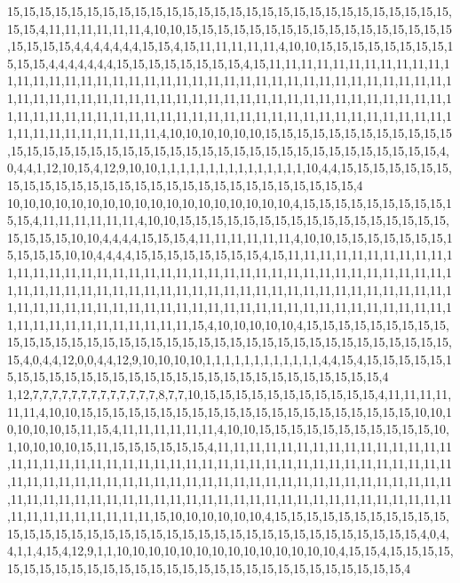 15,15,15,15,15,15,15,15,15,15,15,15,15,15,15,15,15,15,15,15,15,15,15,15,15,15,15,15,15,15,4,11,11,11,11,11,11,4,10,10,15,15,15,15,15,15,15,15,15,15,15,15,15,15,15,15,15,15,15,15,15,4,4,4,4,4,4,4,15,15,4,15,11,11,11,11,11,4,10,10,15,15,15,15,15,15,15,15,15,15,15,4,4,4,4,4,4,4,15,15,15,15,15,15,15,15,4,15,11,11,11,11,11,11,11,11,11,11,11,11,11,11,11,11,11,11,11,11,11,11,11,11,11,11,11,11,11,11,11,11,11,11,11,11,11,11,11,11,11,11,11,11,11,11,11,11,11,11,11,11,11,11,11,11,11,11,11,11,11,11,11,11,11,11,11,11,11,11,11,11,11,11,11,11,11,11,11,11,11,11,11,11,11,11,11,11,11,11,11,11,11,11,11,11,11,11,11,11,11,11,11,11,11,4,10,10,10,10,10,10,15,15,15,15,15,15,15,15,15,15,15,15,15,15,15,15,15,15,15,15,15,15,15,15,15,15,15,15,15,15,15,15,15,15,15,15,15,15,15,4,0,4,4,1,12,10,15,4,12,9,10,10,1,1,1,1,1,1,1,1,1,1,1,1,1,1,1,10,4,4,15,15,15,15,15,15,15,15,15,15,15,15,15,15,15,15,15,15,15,15,15,15,15,15,15,15,15,15,15,4
10,10,10,10,10,10,10,10,10,10,10,10,10,10,10,10,10,10,4,15,15,15,15,15,15,15,15,15,15,15,4,11,11,11,11,11,11,4,10,10,15,15,15,15,15,15,15,15,15,15,15,15,15,15,15,15,15,15,15,15,15,10,10,4,4,4,4,15,15,15,4,11,11,11,11,11,11,4,10,10,15,15,15,15,15,15,15,15,15,15,15,10,10,4,4,4,4,15,15,15,15,15,15,15,15,4,15,11,11,11,11,11,11,11,11,11,11,11,11,11,11,11,11,11,11,11,11,11,11,11,11,11,11,11,11,11,11,11,11,11,11,11,11,11,11,11,11,11,11,11,11,11,11,11,11,11,11,11,11,11,11,11,11,11,11,11,11,11,11,11,11,11,11,11,11,11,11,11,11,11,11,11,11,11,11,11,11,11,11,11,11,11,11,11,11,11,11,11,11,11,11,11,11,11,11,11,11,11,11,11,11,11,11,15,4,10,10,10,10,10,4,15,15,15,15,15,15,15,15,15,15,15,15,15,15,15,15,15,15,15,15,15,15,15,15,15,15,15,15,15,15,15,15,15,15,15,15,15,15,4,0,4,4,12,0,0,4,4,12,9,10,10,10,10,1,1,1,1,1,1,1,1,1,1,1,1,4,4,15,4,15,15,15,15,15,15,15,15,15,15,15,15,15,15,15,15,15,15,15,15,15,15,15,15,15,15,15,15,15,4
1,12,7,7,7,7,7,7,7,7,7,7,7,7,7,8,7,7,10,15,15,15,15,15,15,15,15,15,15,15,4,11,11,11,11,11,11,4,10,10,15,15,15,15,15,15,15,15,15,15,15,15,15,15,15,15,15,15,15,15,15,10,10,10,10,10,10,15,11,15,4,11,11,11,11,11,11,4,10,10,15,15,15,15,15,15,15,15,15,15,15,10,1,10,10,10,10,15,11,15,15,15,15,15,15,4,11,11,11,11,11,11,11,11,11,11,11,11,11,11,11,11,11,11,11,11,11,11,11,11,11,11,11,11,11,11,11,11,11,11,11,11,11,11,11,11,11,11,11,11,11,11,11,11,11,11,11,11,11,11,11,11,11,11,11,11,11,11,11,11,11,11,11,11,11,11,11,11,11,11,11,11,11,11,11,11,11,11,11,11,11,11,11,11,11,11,11,11,11,11,11,11,11,11,11,11,11,11,11,11,11,11,11,11,15,10,10,10,10,10,10,4,15,15,15,15,15,15,15,15,15,15,15,15,15,15,15,15,15,15,15,15,15,15,15,15,15,15,15,15,15,15,15,15,15,15,15,15,15,4,0,4,4,1,1,4,15,4,12,9,1,1,10,10,10,10,10,10,10,10,10,10,10,10,10,10,4,15,15,4,15,15,15,15,15,15,15,15,15,15,15,15,15,15,15,15,15,15,15,15,15,15,15,15,15,15,15,15,15,4
